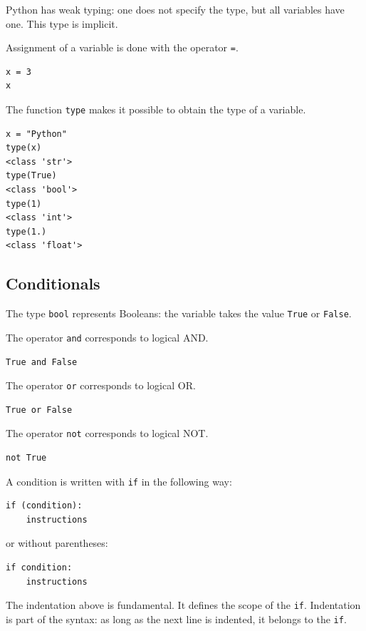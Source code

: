 \documentclass[11pt]{article}
\begin{document}
Python has weak typing: one does not specify the type, but all variables have one. This type is implicit.

Assignment of a variable is done with the operator \texttt{=}.

\begin{lstlisting}
x = 3
x
\end{lstlisting}

The function \texttt{type} makes it possible to obtain the type of a variable.

\begin{lstlisting}
x = "Python"
type(x)
<class 'str'>
type(True)
<class 'bool'>
type(1)
<class 'int'>
type(1.)
<class 'float'>
\end{lstlisting}

\subsection{Conditionals}

The type \texttt{bool} represents Booleans: the variable takes the value \texttt{True} or \texttt{False}.

The operator \texttt{and} corresponds to logical AND.

\begin{lstlisting}
True and False
\end{lstlisting}

The operator \texttt{or} corresponds to logical OR.

\begin{lstlisting}
True or False
\end{lstlisting}

The operator \texttt{not} corresponds to logical NOT.

\begin{lstlisting}
not True
\end{lstlisting}

A condition is written with \texttt{if} in the following way:

\begin{lstlisting}
if (condition):
    instructions
\end{lstlisting}

or without parentheses:

\begin{lstlisting}
if condition:
    instructions
\end{lstlisting}

The indentation above is fundamental. It defines the scope of the \texttt{if}. Indentation is part of the syntax: as long as the next line is indented, it belongs to the \texttt{if}.
\end{document}
